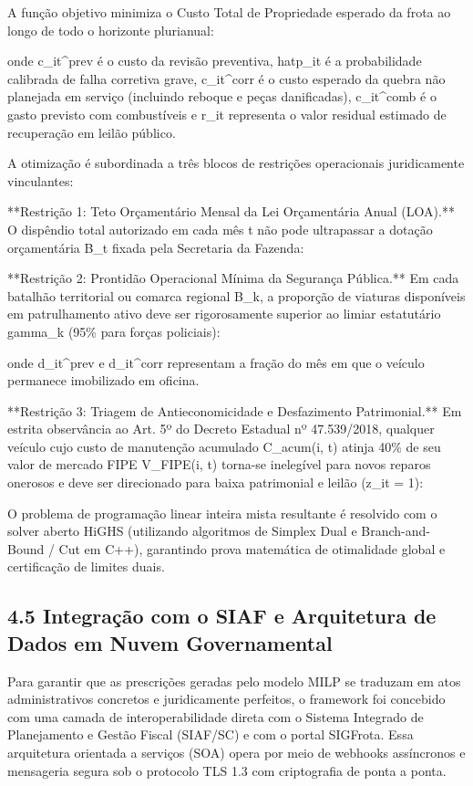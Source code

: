\documentclass[10pt,a4paper,journal]{article}
\begin{document}
A função objetivo minimiza o Custo Total de Propriedade esperado da frota ao longo de todo o horizonte plurianual:

onde c\_{it}^{prev} é o custo da revisão preventiva, hat{p}\_{it} é a probabilidade calibrada de falha corretiva grave, c\_{it}^{corr} é o custo esperado da quebra não planejada em serviço (incluindo reboque e peças danificadas), c\_{it}^{comb} é o gasto previsto com combustíveis e r\_{it} representa o valor residual estimado de recuperação em leilão público.

A otimização é subordinada a três blocos de restrições operacionais juridicamente vinculantes:

**Restrição 1: Teto Orçamentário Mensal da Lei Orçamentária Anual (LOA).** O dispêndio total autorizado em cada mês t não pode ultrapassar a dotação orçamentária B\_t fixada pela Secretaria da Fazenda:

**Restrição 2: Prontidão Operacional Mínima da Segurança Pública.** Em cada batalhão territorial ou comarca regional B\_k, a proporção de viaturas disponíveis em patrulhamento ativo deve ser rigorosamente superior ao limiar estatutário gamma\_k (95\% para forças policiais):

onde d\_{it}^{prev} e d\_{it}^{corr} representam a fração do mês em que o veículo permanece imobilizado em oficina.

**Restrição 3: Triagem de Antieconomicidade e Desfazimento Patrimonial.** Em estrita observância ao Art. 5º do Decreto Estadual nº 47.539/2018, qualquer veículo cujo custo de manutenção acumulado C\_{acum}(i, t) atinja 40\% de seu valor de mercado FIPE V\_{FIPE}(i, t) torna-se inelegível para novos reparos onerosos e deve ser direcionado para baixa patrimonial e leilão (z\_{it} = 1):

O problema de programação linear inteira mista resultante é resolvido com o solver aberto HiGHS (utilizando algoritmos de Simplex Dual e Branch-and-Bound / Cut em C++), garantindo prova matemática de otimalidade global e certificação de limites duais.

\subsection{4.5 Integração com o SIAF e Arquitetura de Dados em Nuvem Governamental}
Para garantir que as prescrições geradas pelo modelo MILP se traduzam em atos administrativos concretos e juridicamente perfeitos, o framework foi concebido com uma camada de interoperabilidade direta com o Sistema Integrado de Planejamento e Gestão Fiscal (SIAF/SC) e com o portal SIGFrota. Essa arquitetura orientada a serviços (SOA) opera por meio de webhooks assíncronos e mensageria segura sob o protocolo TLS 1.3 com criptografia de ponta a ponta.
\end{document}
